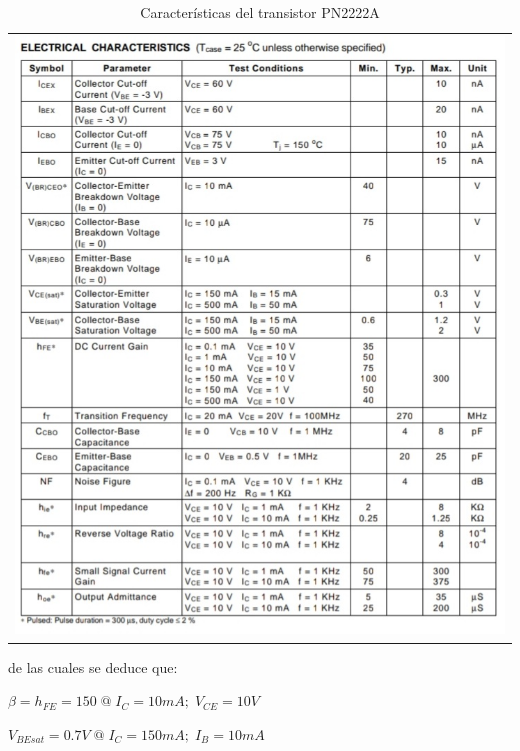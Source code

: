 \documentclass[12pt, a4paper]{article}
\begin{document}
    \begin{table}[h!]
        \centering
        \caption{Características del transistor PN2222A} %
        \label{tab:especificaciones} %
        \begin{tabular}{c}
            \includegraphics[height=20cm\textwidth]{pn2222a.jpg} \\
        \end{tabular}
    \end{table}
    
    de las cuales se deduce que:

    $\beta = h_{FE} = 150 \; @ \; I_C = 10mA; \; V_{CE} = 10V$

    $V_{BEsat} = 0.7V \; @ \; I_C = 150mA; \; I_B = 10mA$
\end{document}
